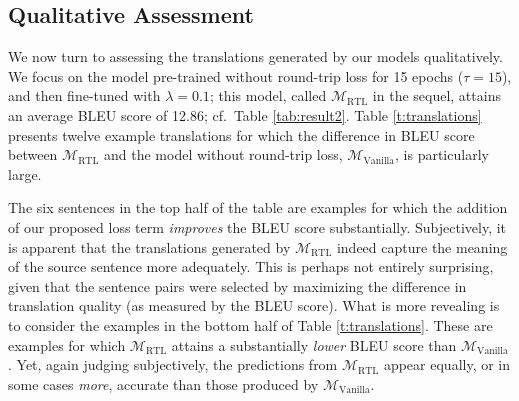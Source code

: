 \documentclass[10pt,a4paper]{article}
\begin{document}
\subsection{Qualitative Assessment}
We now turn to assessing the translations generated by our models qualitatively. We focus on the model pre-trained without round-trip loss for 15 epochs ($\tau=15$), and then fine-tuned with $\lambda=0.1$; this model, called $\mathcal{M}_\mathrm{RTL}$ in the sequel, attains an average BLEU score of 12.86; cf.\ Table \ref{tab:result2}. Table \ref{t:translations} presents twelve example translations for which the difference in BLEU score between $\mathcal{M}_\mathrm{RTL}$ and the model without round-trip loss, $\mathcal{M}_\mathrm{Vanilla}$, is particularly large.

The six sentences in the top half of the table are examples for which the addition of our proposed loss term \emph{improves} the BLEU score substantially. Subjectively, it is apparent that the translations generated by $\mathcal{M}_\mathrm{RTL}$ indeed capture the meaning of the source sentence more adequately. This is perhaps not entirely surprising, given that the sentence pairs were selected by maximizing the difference in translation quality (as measured by the BLEU score). What is more revealing is to consider the examples in the bottom half of Table \ref{t:translations}. These are examples for which $\mathcal{M}_\mathrm{RTL}$ attains a substantially \emph{lower} BLEU score than $\mathcal{M}_\mathrm{Vanilla}$. Yet, again judging subjectively, the predictions from $\mathcal{M}_\mathrm{RTL}$ appear equally, or in some cases \emph{more}, accurate than those produced by $\mathcal{M}_\mathrm{Vanilla}$.
\end{document}
